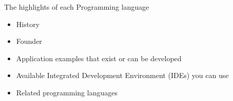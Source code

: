 \titleframe




\begin{frame}{The highlights of each Programming language}
	\begin{itemize}
		\item  History
		\item  Founder
		\item  Application examples that exist or can be developed
		\item  Available Integrated Development Environment (IDEs) you can use
		\item  Related programming languages
		
		
	\end{itemize}
\end{frame}


